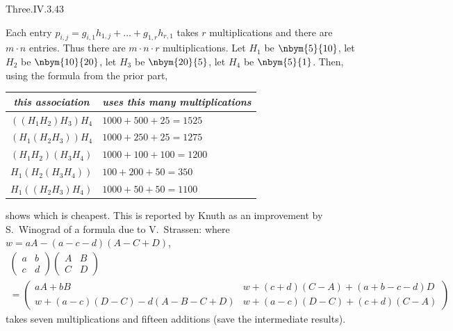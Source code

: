 \begin{ans}{Three.IV.3.43}
      \begin{exparts}
        \partsitem Each entry \(p_{i,j}=g_{i,1}h_{1,j}+\dots+g_{1,r}h_{r,1}  \)
          takes \( r \) multiplications and there are \( m\cdot n \) entries.
          Thus there are \( m\cdot n\cdot r \) multiplications.
        \partsitem Let \( H_1 \) be \( \nbym{5}{10} \),
           let \( H_2 \) be \( \nbym{10}{20} \),
           let \( H_3 \) be \( \nbym{20}{5} \),
           let \( H_4 \) be \( \nbym{5}{1} \).
           Then, using the formula from the prior part,
           \begin{center}
             \begin{tabular}{l|l}
               \multicolumn{1}{c}{\textit{this association}}
                &\multicolumn{1}{c}{\textit{uses this many multiplications}}\\
               \hline
               \( ((H_1H_2)H_3)H_4 \)     &\( 1000+500+25=1525 \)  \\
               \( (H_1(H_2H_3))H_4 \)     &\( 1000+250+25=1275 \)  \\
               \( (H_1H_2)(H_3H_4) \)     &\( 1000+100+100=1200 \)  \\
               \( H_1(H_2(H_3H_4)) \)     &\( 100+200+50=350    \)  \\
               \( H_1((H_2H_3)H_4) \)     &\( 1000+50+50=1100    \)
             \end{tabular}
           \end{center}
           shows which is cheapest.
         \partsitem This is reported by Knuth
           as an improvement by S.~Winograd of a formula due to
           V.~Strassen:
           where \( w=aA-(a-c-d)(A-C+D) \),
           \begin{multline*}
               \begin{pmatrix}
                 a  &b  \\
                 c  &d
               \end{pmatrix}
               \begin{pmatrix}
                 A  &B  \\
                 C  &D
                 \end{pmatrix}    \\
               =
               \begin{pmatrix}
                  aA+bB
                  &w+(c+d)(C-A)+(a+b-c-d)D \\
                  w+(a-c)(D-C)-d(A-B-C+D)
                  &w+(a-c)(D-C)+(c+d)(C-A)
               \end{pmatrix}
           \end{multline*}
           takes seven multiplications and fifteen additions (save the
           intermediate results).
      \end{exparts}
    
\end{ans}
